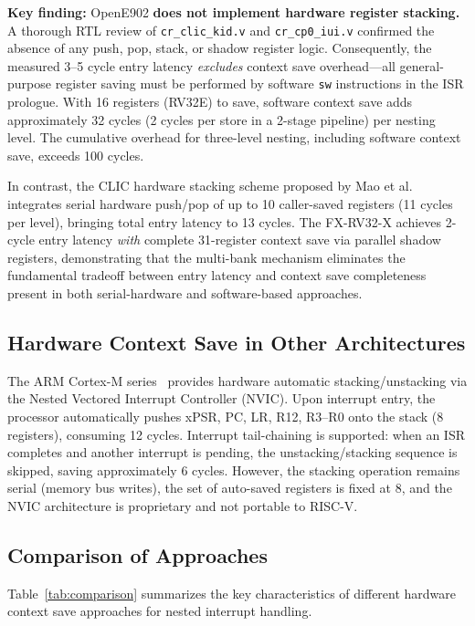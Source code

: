 \documentclass[letterpaper,journal]{IEEEtran}
\begin{document}
\textbf{Key finding:} OpenE902 \textbf{does not implement hardware register stacking.}
A thorough RTL review of \texttt{cr\_clic\_kid.v} and \texttt{cr\_cp0\_iui.v} confirmed the absence of any push, pop, stack, or shadow register logic.
Consequently, the measured 3--5 cycle entry latency \emph{excludes} context save overhead—all general-purpose register saving must be performed by software \texttt{sw} instructions in the ISR prologue.
With 16 registers (RV32E) to save, software context save adds approximately 32 cycles (2 cycles per store in a 2-stage pipeline) per nesting level.
The cumulative overhead for three-level nesting, including software context save, exceeds 100 cycles.

In contrast, the CLIC hardware stacking scheme proposed by Mao et al.~\cite{ref5} integrates serial hardware push/pop of up to 10 caller-saved registers (11 cycles per level), bringing total entry latency to 13 cycles.
The FX-RV32-X achieves 2-cycle entry latency \emph{with} complete 31-register context save via parallel shadow registers, demonstrating that the multi-bank mechanism eliminates the fundamental tradeoff between entry latency and context save completeness present in both serial-hardware and software-based approaches.

\subsection{Hardware Context Save in Other Architectures}

The ARM Cortex-M series~\cite{ref7} provides hardware automatic stacking/unstacking via the Nested Vectored Interrupt Controller (NVIC).
Upon interrupt entry, the processor automatically pushes xPSR, PC, LR, R12, R3--R0 onto the stack (8 registers), consuming 12 cycles.
Interrupt tail-chaining is supported: when an ISR completes and another interrupt is pending, the unstacking/stacking sequence is skipped, saving approximately 6 cycles.
However, the stacking operation remains serial (memory bus writes), the set of auto-saved registers is fixed at 8, and the NVIC architecture is proprietary and not portable to RISC-V.

\subsection{Comparison of Approaches}

Table~\ref{tab:comparison} summarizes the key characteristics of different hardware context save approaches for nested interrupt handling.
\end{document}
